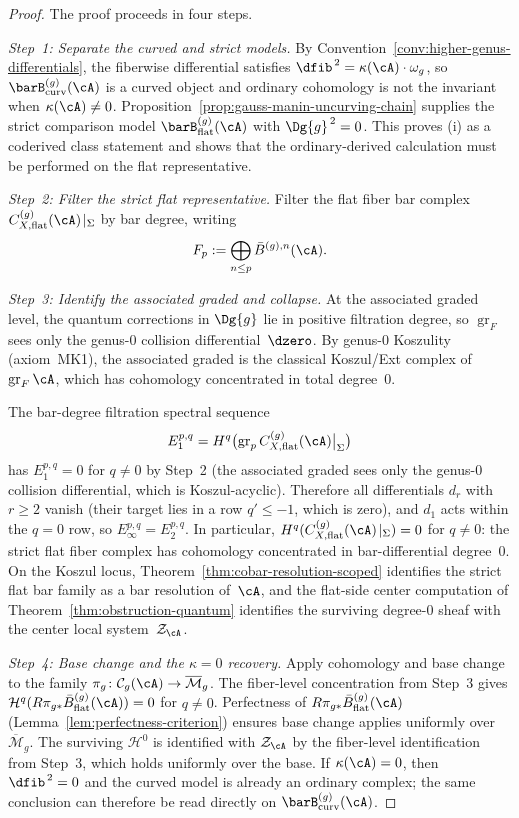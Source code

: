 \begin{proof}
The proof proceeds in four steps.

\emph{Step~1: Separate the curved and strict models.}
By Convention~\ref{conv:higher-genus-differentials}, the fiberwise
differential satisfies
$\dfib^{\,2} = \kappa(\cA)\cdot\omega_g$, so
$\barB^{(g)}_{\mathrm{curv}}(\cA)$ is a curved object and ordinary
cohomology is not the invariant when $\kappa(\cA)\neq 0$.
Proposition~\ref{prop:gauss-manin-uncurving-chain} supplies the strict
comparison model
$\barB^{(g)}_{\mathrm{flat}}(\cA)$ with $\Dg{g}^{\,2}=0$.
This proves \textup{(i)} as a coderived class statement and shows
that the ordinary-derived calculation must be performed on the flat
representative.

\emph{Step~2: Filter the strict flat representative.}
Filter the flat fiber bar complex
$C^{(g)}_{X,\mathrm{flat}}(\cA)\!\mid_\Sigma$ by bar degree, writing
\[
F_p := \bigoplus_{n \leq p} \bar{B}^{(g),n}(\cA).
\]

\emph{Step~3: Identify the associated graded and collapse.}
At the associated graded level, the quantum corrections in
$\Dg{g}$ lie in positive filtration degree, so
$\operatorname{gr}_F$ sees only the genus-$0$
collision differential~$\dzero$.
By genus-$0$ Koszulity (axiom~MK1), the associated graded is
the classical Koszul/Ext complex of
$\operatorname{gr}_F \cA$, which has cohomology concentrated
in total degree~$0$.

The bar-degree filtration spectral sequence
\[
E_1^{p,q} = H^q\bigl(\operatorname{gr}_p
C^{(g)}_{X,\mathrm{flat}}(\cA)\big|_\Sigma\bigr)
\]
has $E_1^{p,q} = 0$ for $q \neq 0$ by Step~2
(the associated graded sees only the
genus-$0$ collision differential, which is Koszul-acyclic).
Therefore all differentials $d_r$ with $r \geq 2$ vanish
(their target lies in a row $q' \leq -1$, which is zero),
and $d_1$ acts within the $q = 0$ row, so
$E_\infty^{p,q} = E_2^{p,q}$. In particular,
$H^q(C^{(g)}_{X,\mathrm{flat}}(\cA)\!\mid_\Sigma) = 0$
for $q \neq 0$: the strict flat fiber complex has cohomology
concentrated in bar-differential degree~$0$.
On the Koszul locus, Theorem~\ref{thm:cobar-resolution-scoped}
identifies the strict flat bar family as a bar resolution of~$\cA$,
and the flat-side center computation of
Theorem~\ref{thm:obstruction-quantum} identifies the surviving
degree-$0$ sheaf with the center local system~$\mathcal{Z}_{\cA}$.

\emph{Step~4: Base change and the $\kappa=0$ recovery.}
Apply cohomology and base change to the family
$\pi_g\colon \mathcal{C}_g(\cA) \to \overline{\mathcal{M}}_g$.
The fiber-level concentration from Step~3 gives
$\mathcal{H}^q(R\pi_{g*}\bar{B}^{(g)}_{\mathrm{flat}}(\cA)) = 0$
for $q \neq 0$.
Perfectness of $R\pi_{g*}\bar{B}^{(g)}_{\mathrm{flat}}(\cA)$
(Lemma~\ref{lem:perfectness-criterion}) ensures base change applies
uniformly over $\overline{\mathcal{M}}_g$.
The surviving $\mathcal{H}^0$ is identified with
$\mathcal{Z}_{\cA}$ by the fiber-level identification
from Step~3, which holds uniformly over the base.
If $\kappa(\cA)=0$, then $\dfib^{\,2}=0$ and the curved model is
already an ordinary complex; the same conclusion can therefore be
read directly on $\barB^{(g)}_{\mathrm{curv}}(\cA)$.
\end{proof}

